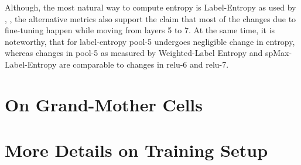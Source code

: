 \documentclass[runningheads]{llncs}
\begin{document}
Although, the most natural way to compute entropy is Label-Entropy as used by \cite{Breiman}, \cite{AmitGeman}, the alternative metrics also support the claim that most of the changes due to fine-tuning happen while moving from layers 5 to 7. At the same time, it is noteworthy, that for label-entropy pool-5 undergoes negligible change in entropy, whereas changes in pool-5 as measured by Weighted-Label Entropy and spMax-Label-Entropy are comparable to changes in relu-6 and relu-7.

\section{On Grand-Mother Cells}

\section{More Details on Training Setup} 





\end{document}
